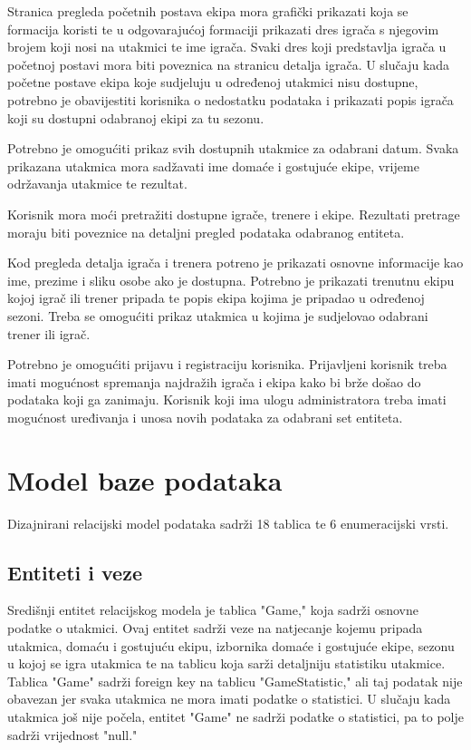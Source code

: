 \documentclass[times, utf8, zavrsni]{fer}
\begin{document}
Stranica pregleda početnih postava ekipa mora grafički prikazati koja se formacija koristi te u odgovarajućoj formaciji prikazati dres igrača s njegovim brojem koji nosi na utakmici te ime igrača.
Svaki dres koji predstavlja igrača u početnoj postavi mora biti poveznica na stranicu detalja igrača.
U slučaju kada početne postave ekipa koje sudjeluju u određenoj utakmici nisu dostupne, potrebno je obavijestiti korisnika o nedostatku podataka i prikazati popis igrača koji su dostupni odabranoj ekipi za tu sezonu.

Potrebno je omogućiti prikaz svih dostupnih utakmice za odabrani datum. Svaka prikazana utakmica mora sadžavati ime domaće i gostujuće ekipe, vrijeme održavanja utakmice te rezultat.

Korisnik mora moći pretražiti dostupne igrače, trenere i ekipe. Rezultati pretrage moraju biti poveznice na detaljni pregled podataka odabranog entiteta.

Kod pregleda detalja igrača i trenera potreno je prikazati osnovne informacije kao ime, prezime i sliku osobe ako je dostupna.
Potrebno je prikazati trenutnu ekipu kojoj igrač ili trener pripada te popis ekipa kojima je pripadao u određenoj sezoni.
Treba se omogućiti prikaz utakmica u kojima je sudjelovao odabrani trener ili igrač.

Potrebno je omogućiti prijavu i registraciju korisnika. Prijavljeni korisnik treba imati mogućnost spremanja najdražih igrača i ekipa kako bi brže došao do podataka koji ga zanimaju.
Korisnik koji ima ulogu administratora treba imati mogućnost uređivanja i unosa novih podataka za odabrani set entiteta.

\chapter{Model baze podataka}

Dizajnirani relacijski model podataka sadrži 18 tablica te 6 enumeracijski vrsti.

\section{Entiteti i veze}

Središnji entitet relacijskog modela je tablica "Game," koja sadrži osnovne podatke o utakmici. Ovaj entitet sadrži veze na natjecanje kojemu pripada utakmica, domaću i gostujuću ekipu, izbornika domaće i gostujuće ekipe,
sezonu u kojoj se igra utakmica te na tablicu koja sarži detaljniju statistiku utakmice. Tablica "Game" sadrži foreign key na tablicu "GameStatistic," ali taj podatak nije obavezan jer svaka utakmica ne mora imati podatke o statistici.
U slučaju kada utakmica još nije počela, entitet "Game" ne sadrži podatke o statistici, pa to polje sadrži vrijednost "null."
\end{document}
